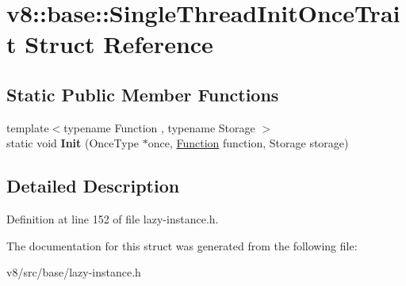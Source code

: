 \hypertarget{structv8_1_1base_1_1SingleThreadInitOnceTrait}{}\section{v8\+:\+:base\+:\+:Single\+Thread\+Init\+Once\+Trait Struct Reference}
\label{structv8_1_1base_1_1SingleThreadInitOnceTrait}
\subsection*{Static Public Member Functions}
\begin{DoxyCompactItemize}
\item 
\mbox{\label{structv8_1_1base_1_1SingleThreadInitOnceTrait_a44e53a3c057ce7a79b4dad0aa568a9fa}} 
{\footnotesize template$<$typename Function , typename Storage $>$ }\\static void {\bfseries Init} (Once\+Type $\ast$once, \mbox{\hyperlink{classv8_1_1Function}{Function}} function, Storage storage)
\end{DoxyCompactItemize}


\subsection{Detailed Description}


Definition at line 152 of file lazy-\/instance.\+h.



The documentation for this struct was generated from the following file\+:\begin{DoxyCompactItemize}
\item 
v8/src/base/lazy-\/instance.\+h\end{DoxyCompactItemize}
